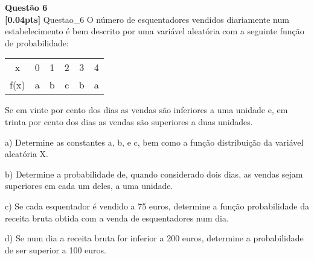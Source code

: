 \documentclass{article}
\newenvironment{problem}[2][Questão]
    { \begin{mdframed}[backgroundcolor=gray!20] \textbf{#1 #2} \\}
    {  \end{mdframed}}
\begin{document}
\begin{problem}{6}
\textbf{[0.04pts]} Questao\_6 O  número  de  esquentadores  vendidos  diariamente  num  estabelecimento  é  bem descrito por uma variável aleatória com a seguinte função de probabilidade:

\begin{center}
\begin{tabular}{ |c|c|c|c|c|c|}
\hline

x & 0 & 1 & 2 & 3 & 4 \\
f(x) & a & b & c & b & a \\

 \hline
\end{tabular}
\end{center}


Se em vinte por cento dos dias as vendas são inferiores a uma unidade e, em  trinta por 
cento dos dias as vendas são superiores a duas unidades. 

a) Determine  as  constantes  a,  b,  e  c,  bem  como  a  função  distribuição  da  variável aleatória X. 

b) Determine  a  probabilidade  de,  quando  considerado  dois  dias,  as  vendas  sejam 
superiores em cada um deles, a uma unidade.

c) Se  cada  esquentador  é  vendido  a  75  euros,  determine  a  função  probabilidade  da receita bruta obtida com a venda de esquentadores num dia. 

d) Se num dia a receita bruta for inferior a 200 euros, determine a probabilidade de ser 
superior a 100 euros. 

\end{problem}
\end{document}
